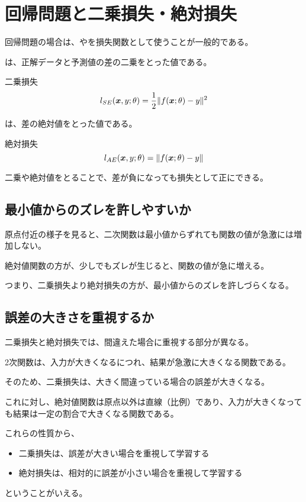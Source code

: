 \documentclass[../../../topic_machine-learning]{subfiles}
\begin{document}
\sectionline
\section{回帰問題と二乗損失・絶対損失}

回帰問題の場合は、やを損失関数として使うことが一般的である。

\br

は、正解データと予測値の差の二乗をとった値である。

\begin{definition}{二乗損失}
  \begin{equation*}
    l_{SE}(\vb*{x}, y; \theta) = \frac{1}{2}\|f(\vb*{x}; \theta) - y\|^2
  \end{equation*}
\end{definition}

は、差の絶対値をとった値である。

\begin{definition}{絶対損失}
  \begin{equation*}
    l_{AE}(\vb*{x}, y; \theta) = \|f(\vb*{x}; \theta) - y\|
  \end{equation*}
\end{definition}

二乗や絶対値をとることで、差が負になっても損失として正にできる。

\subsection{最小値からのズレを許しやすいか}

原点付近の様子を見ると、二次関数は最小値からずれても関数の値が急激には増加しない。

絶対値関数の方が、少しでもズレが生じると、関数の値が急に増える。

\br

つまり、二乗損失より絶対損失の方が、最小値からのズレを許しづらくなる。

\subsection{誤差の大きさを重視するか}

二乗損失と絶対損失では、間違えた場合に重視する部分が異なる。

\br

2次関数は、入力が大きくなるにつれ、結果が急激に大きくなる関数である。

そのため、二乗損失は、大きく間違っている場合の誤差が大きくなる。

\br

これに対し、絶対値関数は原点以外は直線（比例）であり、入力が大きくなっても結果は一定の割合で大きくなる関数である。

\br

これらの性質から、
\begin{itemize}
  \item 二乗損失は、誤差が大きい場合を重視して学習する
  \item 絶対損失は、相対的に誤差が小さい場合を重視して学習する
\end{itemize}
ということがいえる。
\end{document}
